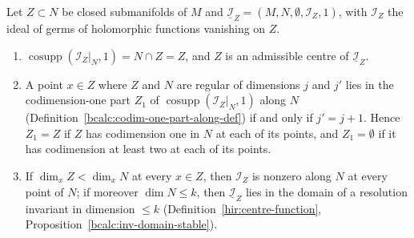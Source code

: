 \begin{proposition}
\label{bcalc:smooth-centre-locus}
\mixedleanok
Let \(Z\subset N\) be closed submanifolds of \(M\) and \(\underline{\mathcal I}_Z=(M,N,\emptyset,\mathcal I_Z,1)\), with \(\mathcal I_Z\) the ideal of germs of holomorphic
functions vanishing on \(Z\).
\begin{enumerate}
\item \(\operatorname{cosupp}(\mathcal I_Z|_N,1)=N\cap Z=Z\), and \(Z\) is an admissible centre of \(\underline{\mathcal I}_Z\).
\item A point \(x\in Z\) where \(Z\) and \(N\) are regular of dimensions \(j\) and \(j'\) lies in the codimension-one part \(Z_1\) of \(\operatorname{cosupp}(\mathcal I_Z|_N,1)\) along
\(N\) (Definition~\ref{bcalc:codim-one-part-along-def}) if and only if \(j'=j+1\). Hence \(Z_1=Z\) if \(Z\) has codimension one in \(N\) at each of its points, and
\(Z_1=\emptyset\) if it has codimension at least two at each of its points.
\item If \(\dim_xZ<\dim_xN\) at every \(x\in Z\), then \(\mathcal I_Z\) is nonzero along \(N\) at every point of \(N\); if moreover \(\dim N\le k\), then
\(\underline{\mathcal I}_Z\) lies in the domain of a resolution invariant in dimension \(\le k\) (Definition~\ref{hir:centre-function}, Proposition~\ref{bcalc:inv-domain-stable}).
\end{enumerate}
\end{proposition}
